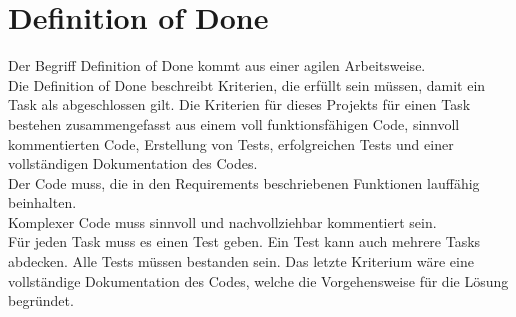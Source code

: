 \section{Definition of Done}\label{sec:dod}

Der Begriff Definition of Done kommt aus einer agilen Arbeitsweise.\\
Die Definition of Done beschreibt Kriterien, die erfüllt sein müssen, damit ein Task als abgeschlossen gilt.
Die Kriterien für dieses Projekts für einen Task bestehen zusammengefasst aus einem voll funktionsfähigen Code, sinnvoll kommentierten Code, Erstellung von Tests, erfolgreichen Tests und einer vollständigen Dokumentation des Codes.\\
Der Code muss, die in den Requirements beschriebenen Funktionen lauffähig beinhalten.\\
Komplexer Code muss sinnvoll und nachvollziehbar kommentiert sein.\\
Für jeden Task muss es einen Test geben.
Ein Test kann auch mehrere Tasks abdecken. Alle Tests müssen bestanden sein.
Das letzte Kriterium wäre eine vollständige Dokumentation des Codes, welche die Vorgehensweise für die Lösung begründet.